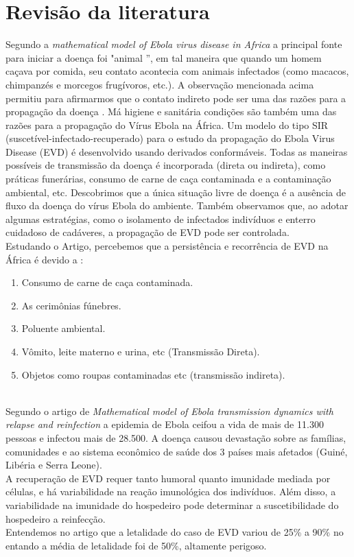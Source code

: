 \documentclass[12pt,a4paper]{article}
\begin{document}
\section*{Revisão da literatura}
Segundo a \emph{mathematical model of Ebola virus disease in Africa} \cite{Aqsa Nazir} a principal fonte para iniciar a doença foi "animal ”, em tal
maneira que quando um homem caçava por comida, seu contato acontecia com animais infectados (como macacos, chimpanzés e
morcegos frugívoros, etc.). A observação mencionada acima permitiu
para afirmarmos que o contato indireto pode ser uma das razões
para a propagação da doença . Má higiene e sanitária
condições são também uma das razões para a propagação do
Vírus Ebola na África.
Um modelo do tipo SIR (suscetível-infectado-recuperado) para o estudo da propagação do Ebola Virus Disease (EVD) é desenvolvido usando derivados conformáveis. Todas as maneiras possíveis de transmissão da doença é incorporada (direta ou indireta), como práticas funerárias, consumo de carne de caça contaminada e a contaminação ambiental, etc.  Descobrimos que a única situação livre de doença é a ausência de fluxo da doença do vírus Ebola do
ambiente. Também observamos que, ao adotar algumas estratégias, como o isolamento de infectados
indivíduos e enterro cuidadoso de cadáveres, a propagação de EVD pode ser controlada. \\
Estudando o Artigo, percebemos que a persistência e recorrência de EVD na África é devido a : \\
\begin{enumerate}
    \item Consumo de carne de caça contaminada.
    \item As cerimônias fúnebres.
    \item Poluente ambiental.
    \item Vômito, leite materno e urina, etc (Transmissão Direta).
    \item Objetos como roupas contaminadas etc (transmissão indireta).
\end{enumerate} 
\\
 Segundo o artigo de \emph{Mathematical model of Ebola transmission dynamics with relapse and reinfection} \cite{F.B. Agusto} a epidemia de Ebola ceifou a vida de mais de 11.300
pessoas e infectou mais de 28.500. A doença causou devastação sobre as famílias, comunidades e ao sistema econômico de saúde dos 3 países mais afetados (Guiné, Libéria e Serra
Leone).\\
A recuperação de EVD requer tanto humoral quanto imunidade mediada por células, e há variabilidade na reação imunológica dos indivíduos. Além disso, a variabilidade
na imunidade do hospedeiro pode determinar a suscetibilidade do hospedeiro a reinfecção. \\
Entendemos no artigo que a letalidade do caso de EVD variou de 25\% a 90\% no entando a média de letalidade foi de 50\%, altamente perigoso. 
\end{document}
